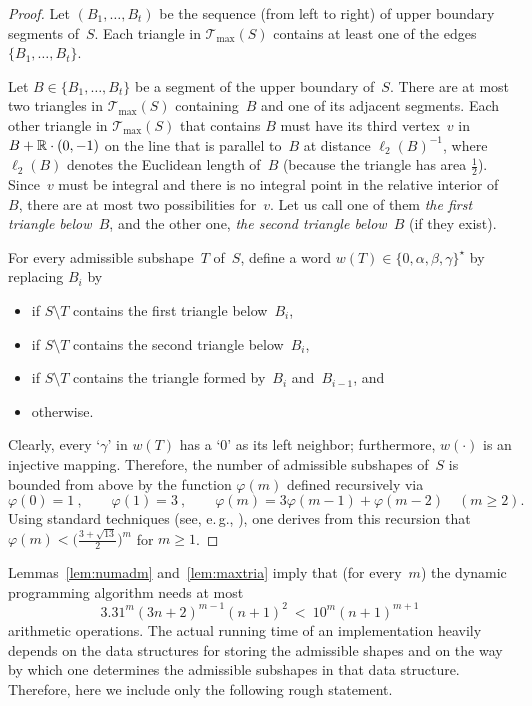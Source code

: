 \begin{proof}
  Let $(B_1,\dots,B_t)$ be the sequence (from left to right) of upper
  boundary segments of~$S$.  Each triangle in $\mathcal{T}_{\max}(S)$
  contains at least one of the edges $\{B_1,\dots,B_t\}$.
  
  Let $B\in\{B_1,\dots,B_t\}$ be a segment of the upper boundary
  of~$S$. There are at most two triangles in $\mathcal{T}_{\max}(S)$
  containing~$B$ and one of its adjacent segments.  Each other
  triangle in $\mathcal{T}_{\max}(S)$ that contains $B$ must have its
  third vertex~$v$ in $B+\mathbb{R}\cdot(0,-1)$ on the line that is parallel
  to~$B$ at distance $\ell_2(B)^{-1}$, where $\ell_2(B)$ denotes the
  Euclidean length of~$B$ (because the triangle has area $\frac12$).
  Since~$v$ must be integral and there is no integral point in the
  relative interior of~$B$, there are at most two possibilities
  for~$v$. Let us call one of them \emph{the first triangle
    below~$B$}, and the other one, \emph{the second triangle
    below~$B$} (if they exist).
  
  For every admissible subshape~$T$ of~$S$, define a word
  $w(T)\in\{0,\alpha,\beta,\gamma\}^{\star}$ by replacing $B_i$ by
  \begin{itemize}\itemsep=-2pt
  \item[`$\alpha$' ] if $S\setminus T$ contains the first triangle below~$B_i$,
  \item[`$\beta$' ] if $S\setminus T$ contains the second triangle below~$B_i$,
  \item[`$\gamma$' ] if $S\setminus T$ contains the triangle formed
    by~$B_i$ and~$B_{i-1}$, and
  \item[`$0$'      ] otherwise.
  \end{itemize}
  Clearly, every `$\gamma$' in $w(T)$ has a `$0$' as its left neighbor;
  furthermore, $w(\cdot)$ is an injective mapping. Therefore, the number
  of admissible subshapes of~$S$ is bounded from above by the
  function $\varphi(m)$ defined recursively via
  $$
  \varphi(0)=1\ ,\qquad
  \varphi(1)=3\ ,\qquad
  \varphi(m)=3\varphi(m-1)+\varphi(m-2)
  \quad(m\geq 2).
  $$
  Using standard techniques 
  (see, e.\,g., \cite[Thm. 4.1.1]{StanleyEnumComb}), one derives 
  from this recursion that
  $\varphi(m)<\big(\frac{3+\sqrt{13}}{2}\big)^m  $ for $m\ge1$. 
\end{proof}

Lemmas~\ref{lem:numadm} and~\ref{lem:maxtria} imply that (for
every~$m$) the dynamic programming algorithm needs at most
$$
3.31^m(3n+2)^{m-1}(n+1)^2\ <\ 10^m (n+1)^{m+1}
$$
arithmetic operations. The actual running time of an implementation
heavily depends on the data structures for storing the admissible
shapes and on the way by which one determines the admissible subshapes in
that data structure. Therefore, here we include only the following
rough statement.

